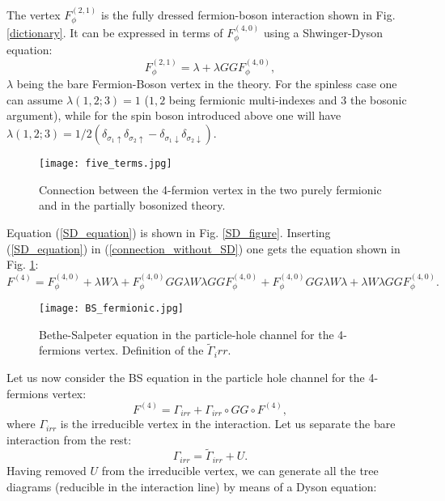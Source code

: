 \documentclass[a4paper,11pt]{article}
\begin{document}
The vertex $F_\phi^{(2,1)}$ is the fully dressed fermion-boson interaction shown in Fig. \ref{dictionary}. It can be expressed in terms of $F_\phi^{(4,0)}$ using a Shwinger-Dyson equation\cite{Schuetz2004}: 
\begin{equation}
\label{SD_equation}
F_\phi^{(2,1)} = \lambda + \lambda G G F_\phi^{(4,0)},   
\end{equation}
 $\lambda$ being the bare Fermion-Boson vertex in the theory. For the spinless case one can assume $\lambda(1,2;3)=1$ ($1,2$ being fermionic multi-indexes and $3$ the bosonic argument), while for the spin boson introduced above one will have $\lambda (1,2;3)=1/2( \delta_{\sigma_1\uparrow}\delta_{\sigma_2\uparrow}-\delta_{\sigma_1\downarrow}
\delta_{\sigma_2\downarrow})$. 
\begin{figure}
\texttt{[image: five\_terms.jpg]}
\caption{Connection between the 4-fermion vertex in the two purely fermionic and in the partially bosonized theory. } \label{five_terms}

\end{figure}
Equation (\ref{SD_equation}) is shown in Fig. \ref{SD_figure}. 
Inserting (\ref{SD_equation}) in (\ref{connection_without_SD}) one gets the equation shown in Fig. \ref{five_terms}:
\begin{equation}
\label{five_terms_eq} 
F^{(4)} = F_\phi^{(4,0)} + \lambda W \lambda +  F_\phi^{(4,0)} G G  \lambda W \lambda G G F_\phi^{(4,0)}+F_\phi^{(4,0)} G G  \lambda W \lambda+\lambda W \lambda G G F_\phi^{(4,0)}.  
\end{equation}
\begin{figure}
\texttt{[image: BS\_fermionic.jpg]}
\caption{Bethe-Salpeter equation in the particle-hole channel for the 4-fermions vertex. 
Definition of the $\tilde \Gamma_irr$. } \label{BS_fermionic}

\end{figure}
Let us now consider the BS equation in the particle hole channel for the 4-fermions vertex: 
\begin{equation}
\label{BS_fermionic_eq} 
F^{(4)} = \Gamma_{irr} + \Gamma_{irr} \circ GG \circ F^{(4)},  
\end{equation}  
where $\Gamma_{irr}$ is the irreducible vertex in the interaction. Let us separate the bare interaction from the rest: 
\begin{equation}
\label{removing_U}
\Gamma_{irr}= \tilde \Gamma_{irr}+U. 
\end{equation} 
Having removed $U$ from the irreducible vertex, we can generate all the tree diagrams (reducible in the interaction line) by means of a Dyson equation: 
\end{document}
